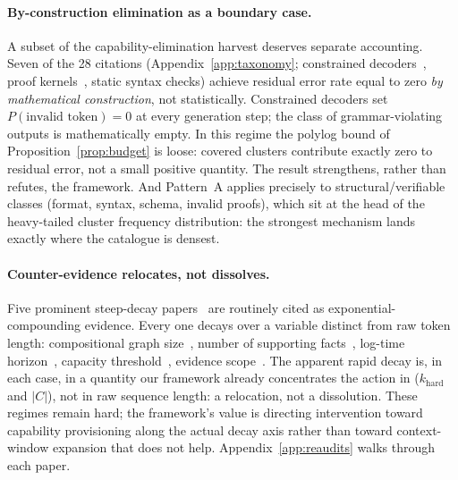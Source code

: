 \documentclass{article}
\theoremstyle{taeplain}
\theoremstyle{taedefn}
\begin{document}
\paragraph{By-construction elimination as a boundary case.}
A subset of the capability-elimination harvest deserves separate accounting. Seven of the 28 citations (Appendix~\ref{app:taxonomy}; constrained decoders~\citep{suresh2025dingo,dong2024xgrammar,dong2026xgrammar2,zhang2023tooldec,openai2024structured}, proof kernels~\citep{ren2025deepseekprover}, static syntax checks) achieve residual error rate equal to zero \emph{by mathematical construction}, not statistically. Constrained decoders set $P(\text{invalid token}) = 0$ at every generation step; the class of grammar-violating outputs is mathematically empty. In this regime the polylog bound of Proposition~\ref{prop:budget} is loose: covered clusters contribute exactly zero to residual error, not a small positive quantity. The result strengthens, rather than refutes, the framework. And Pattern~A applies precisely to structural/verifiable classes (format, syntax, schema, invalid proofs), which sit at the head of the heavy-tailed cluster frequency distribution: the strongest mechanism lands exactly where the catalogue is densest.

\paragraph{Counter-evidence relocates, not dissolves.}
Five prominent steep-decay papers~\citep{dziri2023faith,kuratov2024babilong,kwa2025horizon,wan2026fano,karpinska2024nocha} are routinely cited as exponential-compounding evidence. Every one decays over a variable distinct from raw token length: compositional graph size~\citep{dziri2023faith}, number of supporting facts~\citep{kuratov2024babilong}, log-time horizon~\citep{kwa2025horizon}, capacity threshold~\citep{wan2026fano}, evidence scope~\citep{karpinska2024nocha}. The apparent rapid decay is, in each case, in a quantity our framework already concentrates the action in ($k_{\text{hard}}$ and $|C|$), not in raw sequence length: a relocation, not a dissolution. These regimes remain hard; the framework's value is directing intervention toward capability provisioning along the actual decay axis rather than toward context-window expansion that does not help. Appendix~\ref{app:reaudits} walks through each paper.
\end{document}
